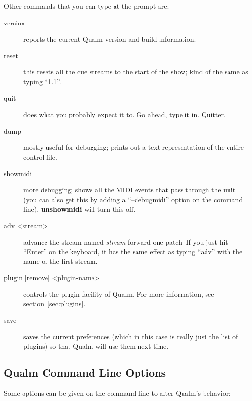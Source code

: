 \documentclass{article}
\newcommand{\q}{{\textsf{Qualm}}\xspace}
\begin{document}
Other commands that you can type at the prompt are:

\begin{description}
\item[version] reports the current \q version and build
      information.

\item[reset] this resets all the cue streams to the start of the
      show; kind of the same as typing ``1.1''.

\item[quit] does what you probably expect it to.  Go ahead, type it
      in.  Quitter.

\item[dump] mostly useful for debugging; prints out a text
      representation of the entire control file.

\item[showmidi] more debugging; shows all the MIDI events that pass
      through the unit (you can also get this by adding a ``--debugmidi''
      option on the command line).  {\bf unshowmidi} will turn this
      off.

\item[adv <stream>] advance the stream named {\em stream}
      forward one patch.  If you just hit ``Enter'' on the keyboard,
      it has the same effect as typing ``adv'' with the name of the
      first stream.

\item[plugin {[remove]} <plugin-name>] controls
      the plugin facility of \q.  For more information, see
      section~\ref{sec:plugins}.

\item[save] saves the current preferences (which in this case is
      really just the list of plugins) so that \q will use them next
      time.
\end{description}

\subsection{\q Command Line Options}

Some options can be given on the command line to alter \q's behavior:
\end{document}
